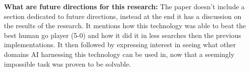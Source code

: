 \documentclass{article}
\begin{document}
\begin{titlepage}
\textbf{What are future directions for this research:} The paper doesn't include a section dedicated to future directions, instead at the end it has a discussion on the results of the research. It mentions how this technology was able to beat the best human go player (5-0) and how it did it in less searches then the previous implementations. It then followed by expressing interest in seeing what other domains AI harnessing this technology can be used in, now that a seemingly impossible task was proven to be solvable. 
\end{titlepage}
\end{document}
